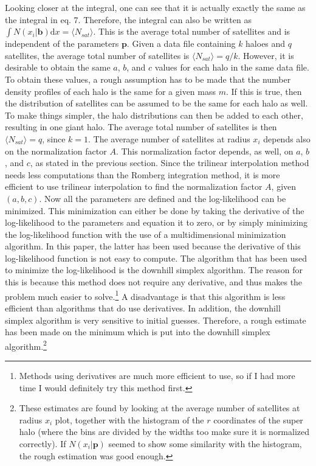 Looking closer at the integral, one can see that it is actually exactly the same as the integral in eq. 7. Therefore, the integral can also be written as $\int N(x_i|\textbf{b})\mathrm{d}x = \langle N_{sat} \rangle$. This is the average total number of satellites and is independent of the parameters $\mathbf{p}$. Given a data file containing $k$ haloes and $q$ satellites, the average total number of satellites is $\langle N_{sat} \rangle = q/k$. However, it is desirable to obtain the same $a$, $b$, and $c$ values for each halo in the same data file. To obtain these values, a rough assumption has to be made that the number density profiles of each halo is the same for a given mass $m$. If this is true, then the distribution of satellites can be assumed to be the same for each halo as well. To make things simpler, the halo distributions can then be added to each other, resulting in one giant halo. The average total number of satellites is then $\langle N_{sat} \rangle = q$, since $k=1$. The average number of satellites at radius $x_i$ depends also on the normalization factor $A$. This normalization factor depends, as well, on $a$, $b$, and $c$, as stated in the previous section. Since the trilinear interpolation method needs less computations than the Romberg integration method, it is more efficient to use trilinear interpolation to find the normalization factor $A$, given $(a,b,c)$. Now all the parameters are defined and the log-likelihood can be minimized. This minimization can either be done by taking the derivative of the log-likelihood to the parameters and equation it to zero, or by simply minimizing the log-likelihood function with the use of a multidimensional minimization algorithm. In this paper, the latter has been used because the derivative of this log-likelihood function is not easy to compute. The algorithm that has been used to minimize the log-likelihood is the downhill simplex algorithm. The reason for this is because this method does not require any derivative, and thus makes the problem much easier to solve.\footnote{Methods using derivatives are much more efficient to use, so if I had more time I would definitely try this method first.} A disadvantage is that this algorithm is less efficient than algorithms that do use derivatives. In addition, the downhill simplex algorithm is very sensitive to initial guesses. Therefore, a rough estimate has been made on the minimum which is put into the downhill simplex algorithm.\footnote{These estimates are found by looking at the average number of satellites at radius $x_i$ plot, together with the histogram of the $r$ coordinates of the super halo (where the bins are divided by the widths too make sure it is normalized correctly). If $N(x_i|\textbf{p})$ seemed to show some similarity with the histogram, the rough estimation was good enough.} \\
